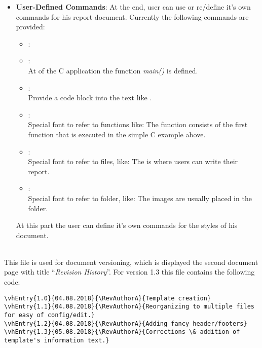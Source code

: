 \begin{description}
\begin{itemize}
\begin{lstlisting}
int main(int argc, char** argv) {
	printf("Hello World!\n");
	return 0;
}
\end{lstlisting}
\item{\textbf{User-Defined Commands}}: At the end, user can use or re/define it's own commands for his report document. Currently the following commands are provided:
\begin{itemize}
\item{\codemr{\\rednote\{\}}:\\ }
\item{\codemr{\\codeline\{\}}:\\ At  of the C application the function \textit{main()} is defined.}
\item{\codemr{\\codemr\{\}}:\\ Provide a code block into the text like }.
\item{\codemr{\\functionname\{\}}:\\ Special font to refer to functions like: The function  consists of the first function that is executed in the simple C example above.}
\item{\codemr{\\filename\{\}}:\\ Special font to refer to files, like: The  is where users can write their report.}
\item{\codemr{\\foldername\{\}}:\\ Special font to refer to folder, like: The images are usually placed in the  folder.}
\end{itemize}
At this part the user can define it's own commands for the styles of his document.
\end{itemize}



\item{\textbf{}} \hfill \\
This file is used for document versioning, which is displayed the second document page with title ``\textit{Revision History}''. For version 1.3 this file contains the following code:
\lstset{language=TeX}
\begin{lstlisting}
\vhEntry{1.0}{04.08.2018}{\RevAuthorA}{Template creation}
\vhEntry{1.1}{04.08.2018}{\RevAuthorA}{Reorganizing to multiple files for easy of config/edit.}
\vhEntry{1.2}{04.08.2018}{\RevAuthorA}{Adding fancy header/footers}
\vhEntry{1.3}{05.08.2018}{\RevAuthorA}{Corrections \& addition of template's information text.}
\end{lstlisting}




\end{description}
